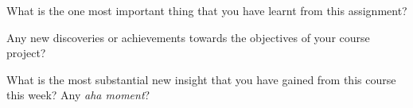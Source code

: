 \documentclass[10pt,letterpaper]{scrartcl}
\begin{document}
What is the one most important thing that you have learnt from this assignment?

\vspace*{3mm}
\hrulefill

\vspace*{3mm}
\hrulefill

Any new discoveries or achievements towards the objectives of your course project?

\vspace*{3mm}
\hrulefill

\vspace*{3mm}
\hrulefill

What is the most substantial new insight that you have gained from this course this week? Any \emph{aha moment}?

\vspace*{3mm}
\hrulefill

\vspace*{3mm}
\hrulefill
\end{document}
